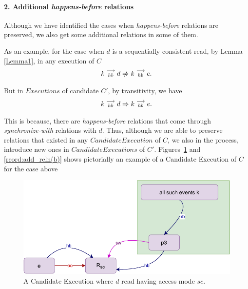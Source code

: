 
\paragraph{2. Additional \textit{happens-before} relations}
    Although we have identified the cases when \textit{happens-before} relations are preserved, we also get some additional relations in some of them.

    As an example, for the case when $d$ is a sequentially consistent read, by Lemma \ref{Lemma1}, in any execution of $C$
    \[
        \reln{k}{hb}{d} \centernot\Rightarrow \reln{k}{hb}{e}. 
    \]

    But in $Executions$ of candidate $C'$, by transitivity, we have 
    \[
        k\stackrel{\longrightarrow}{_{hb}}d \Rightarrow k\stackrel{\longrightarrow}{_{hb}}e. 
    \]

    This is because, there are \textit{happens-before} relations that come through \textit{synchronize-with} relations with $d$. 
    Thus, although we are able to preserve relations that existed in any $Candidate Execution$ of $C$, we also in the process, introduce new ones in $Candidate Executions$ of $C'$. 
    Figures~\ref{reord:add_reln(a)} and \ref{reord:add_reln(b)} shows pictorially an example of a Candidate Execution of $C$ for the case above 
    \begin{figure}[H]
        \centering
        \includegraphics[scale=0.7]{5.InstructionReordering/4.ValidReorderingCandidate/ProofParts/Part2/part2(c).pdf}
        \caption{A Candidate Execution where $d$ read having access mode $sc$.}
        \label{reord:add_reln(a)}
    \end{figure}

